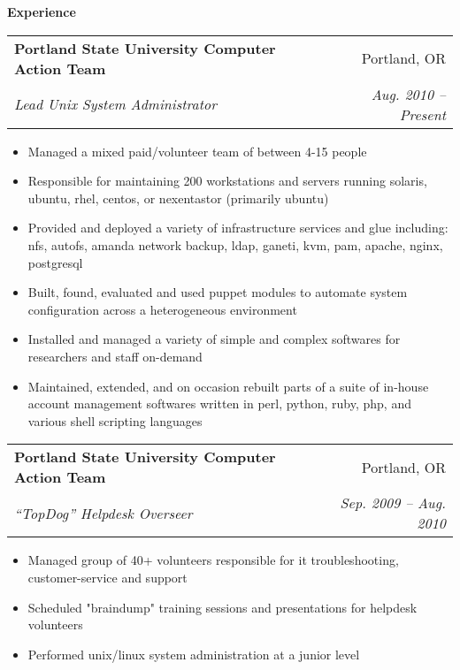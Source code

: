 \documentclass[letterpaper,11pt]{article}
\makeatletter
\newcommand{\resitem}[1]{
  \item #1 \vspace{-2pt}
}
\newcommand{\resheading}[1]{
  {
    \large \colorbox{mygrey}{
      \begin{minipage}{\textwidth}{
        \textbf{#1 \vphantom{p\^{E}}}
      }\end{minipage}
    }
  }
}
\newcommand{\ressubheading}[4]{
  \begin{tabular*}{6.75 in}{l@{\extracolsep{\fill}}r}
    \textbf{#1} & #2 \\
    \textit{#3} & \textit{#4} \\
  \end{tabular*}\vspace{-6pt}
}
\makeatother
\begin{document}
\resheading{Experience}
  \begin{description}
  
    \item
      \ressubheading{
        Portland State University Computer Action Team
      } {
        Portland, OR
      } {
        Lead Unix System Administrator
      } {
        Aug. 2010 -- Present
      } { \footnotesize
        \begin{itemize}
          \resitem{
            Managed a mixed paid/volunteer team of between 4-15 people
          }
          \resitem{
            Responsible for maintaining 200 workstations and servers running
            {\sc s}olaris, {\sc u}buntu, {\sc rhel}, {\sc c}ent{\sc os}, or
            {\sc n}exenta{\sc s}tor (primarily {\sc u}buntu)
          }
          \resitem{
            Provided and deployed a variety of infrastructure services
            and glue including: {\sc nfs}, autofs, amanda network backup, {\sc ldap}, ganeti,
            kvm, pam, apache, nginx, postgresql
          }
          \resitem{
            Built, found, evaluated and used {\sc p}uppet modules to automate system
            configuration across a heterogeneous environment
          }
          \resitem{
            Installed and managed a variety of simple and complex softwares for
            researchers and staff on-demand
          }
          \resitem{
            Maintained, extended, and on occasion rebuilt parts of a suite of
            in-house account management softwares written in perl, python, ruby,
            php, and various shell scripting languages
          }
        \end{itemize}
      }

    \item
      \ressubheading{
        Portland State University Computer Action Team
      } {
        Portland, OR
      } {
       ``TopDog'' Helpdesk Overseer
      } {
        Sep. 2009 -- Aug. 2010
      } { \footnotesize
        \begin{itemize}
          \resitem{
            Managed group of 40+ volunteers responsible for {\sc it} troubleshooting,
            customer-service and support
          }
          \resitem{
            Scheduled "braindump" training sessions and presentations for helpdesk
            volunteers
          }
          \resitem{
            Performed {\sc u}nix/{\sc l}inux system administration at a junior level
          }
        \end{itemize}
      }
      

\end{description}
\end{document}
